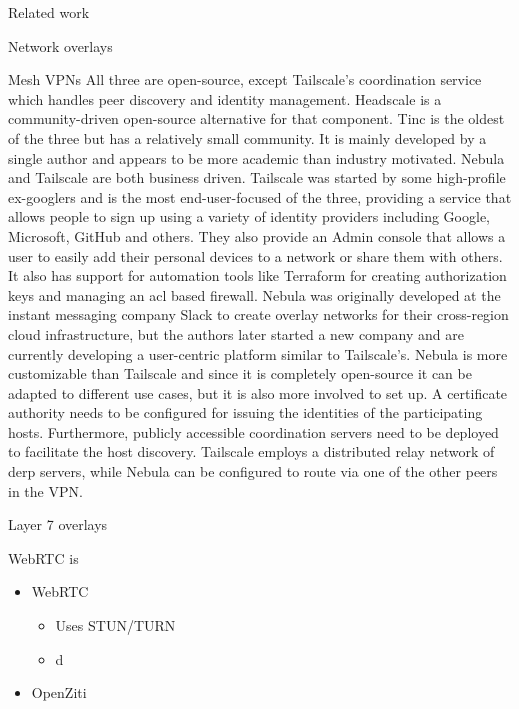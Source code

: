 \begin{frame}[fragile]{Related work}
\begin{block}{Network overlays}
\begin{block}{Mesh VPNs}
All three are open-source, except Tailscale's coordination service which
handles peer discovery and identity management. Headscale
\autocite{fontJuanfontHeadscale2022} is a community-driven open-source
alternative for that component. Tinc is the oldest of the three but has
a relatively small community. It is mainly developed by a single author
and appears to be more academic than industry motivated. Nebula and
Tailscale are both business driven. Tailscale was started by some
high-profile ex-googlers and is the most end-user-focused of the three,
providing a service that allows people to sign up using a variety of
identity providers including Google, Microsoft, GitHub and others. They
also provide an Admin console that allows a user to easily add their
personal devices to a network or share them with others. It also has
support for automation tools like Terraform for creating authorization
keys and managing an \gls{acl} based firewall. Nebula was originally
developed at the instant messaging company Slack to create overlay
networks for their cross-region cloud infrastructure, but the authors
later started a new company and are currently developing a user-centric
platform similar to Tailscale's. Nebula is more customizable than
Tailscale and since it is completely open-source it can be adapted to
different use cases, but it is also more involved to set up. A
certificate authority needs to be configured for issuing the identities
of the participating hosts. Furthermore, publicly accessible
coordination servers need to be deployed to facilitate the host
discovery. Tailscale employs a distributed relay network of \gls{derp}
servers, while Nebula can be configured to route via one of the other
peers in the VPN.
\end{block}

\begin{block}{Layer 7 overlays}
\protect\hypertarget{thesis__020-related-work.md__layer-7-overlays}{}
\begin{block}{WebRTC is}
\protect\hypertarget{thesis__020-related-work.md__webrtc-is}{}
\begin{itemize}
\tightlist
\item
  WebRTC

  \begin{itemize}
  \tightlist
  \item
    Uses STUN/TURN
  \item
    d
  \end{itemize}
\item
  OpenZiti


\end{itemize}
\end{block}
\end{block}
\end{block}
\end{frame}

